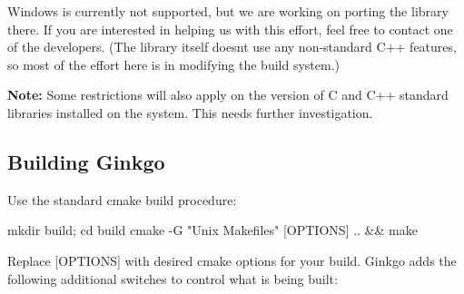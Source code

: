Windows is currently not supported, but we are working on porting the library there. If you are interested in helping us with this effort, feel free to contact one of the developers. (The library itself doesn\textquotesingle{}t use any non-\/standard C++ features, so most of the effort here is in modifying the build system.)

{\bfseries Note\+:} Some restrictions will also apply on the version of C and C++ standard libraries installed on the system. This needs further investigation.

\subsection*{Building Ginkgo }

Use the standard cmake build procedure\+:


\begin{DoxyCode}
mkdir build; cd build
cmake -G "Unix Makefiles" [OPTIONS] .. && make
\end{DoxyCode}


Replace {\ttfamily \mbox{[}O\+P\+T\+I\+O\+NS\mbox{]}} with desired cmake options for your build. Ginkgo adds the following additional switches to control what is being built\+:


